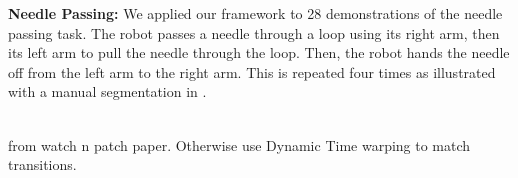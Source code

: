 \vspace{0.5em}
\noindent\textbf{Needle Passing: } We applied our framework to 28 demonstrations of the needle passing task.
The robot passes a needle through a loop using its right arm, then its left arm to pull the needle through the loop. Then, the robot hands the needle off from the left arm to the right arm. This is repeated four times as illustrated with a manual segmentation in 
.

\\
 from watch n patch paper. Otherwise use Dynamic Time warping to match transitions.


